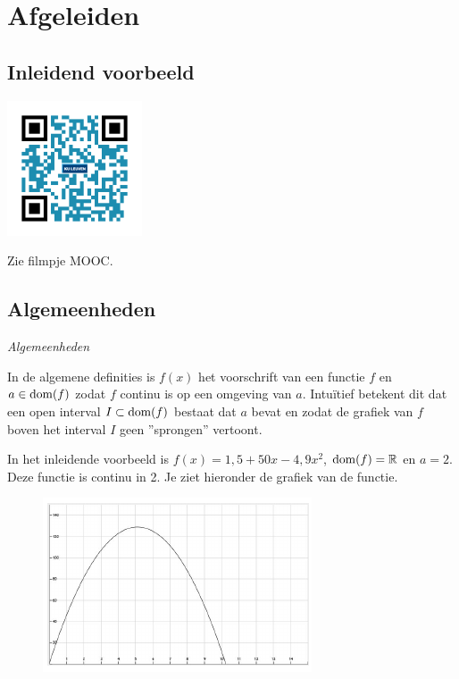\section{Afgeleiden}

\subsection{Inleidend voorbeeld}
\begin{minipage}{.25\linewidth}
	\raggedright
	\includegraphics[width=4cm]{6_afgeleiden_integralen/inputs/QR_Code_INLEIDENDVB_module6}
\end{minipage}
\begin{minipage}{.7\linewidth}
	Zie filmpje MOOC.
\end{minipage}

\subsection{Algemeenheden}

\emph{Algemeenheden}

In de algemene definities is $f(x)$ het voorschrift van een functie $f$ en $a \in \operatorname{dom} (f)$ zodat $f$ continu is op een omgeving van $a$.
Intu\"itief betekent dit dat een open interval $I \subset \operatorname{dom} (f)$ bestaat dat $a$ bevat en zodat de grafiek van $f$ boven het interval $I$ geen ''sprongen'' vertoont.\vspace{5mm}

\begin{voorbeeld}
	In het inleidende voorbeeld is $f(x)=1,5+50 x -4,9 x^2$, $\operatorname{dom} (f)= \mathbb{R}$ en $a=2$.
	Deze functie is continu in 2. Je ziet hieronder de grafiek van de functie.
	\begin{figure}[h]
		\begin{center}
			\includegraphics[height=5 cm]{6_afgeleiden_integralen/inputs/graf.JPG}
		\end{center}
	\end{figure}
\end{voorbeeld}

